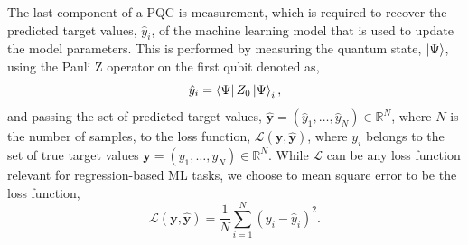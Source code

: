 \documentclass[journal=jacsat,manuscript=article]{achemso}
\begin{document}
The last component of a PQC is measurement, which is required to recover the predicted target values, $\hat{y}_{i}$, of the machine learning model that is used to update the model parameters.
This is performed by measuring the quantum state, $\ket{\Psi}$, using the Pauli Z operator on the first qubit denoted as,
\begin{equation}
	\hat{y}_{i} = \bra{\Psi}Z_{0}\ket{\Psi}_{i},
	\label{eq:y_pred}
\end{equation}
and passing the set of predicted target values, $\bm{\hat{y}} = (\hat{y}_{1}, \ldots, \hat{y}_{N}) \in \mathbb{R}^{N}$, where $N$ is the number of samples, to the loss function, $\mathcal{L}(\bm{y}, \bm{\hat y})$, where $y_{i}$ belongs to the set of true target values $\bm{y} = (y_{1}, \ldots, y_{N}) \in \mathbb{R}^{N}$.
While $\mathcal{L}$ can be any loss function relevant for regression-based ML tasks, we choose to mean square error to be the loss function,
\begin{equation}
	\mathcal{L}(\bm{y}, \bm{\hat y}) = \frac{1}{N} \sum_{i=1}^{N} (y_{i} - \hat{y}_{i})^{2}.
	\label{eq:isthisloss}
\end{equation}
\end{document}
